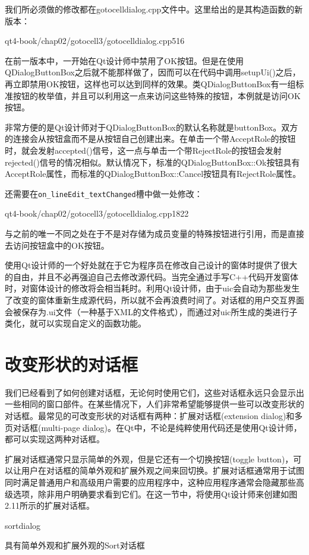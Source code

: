 \documentclass[11pt,oneside]{book}
\begin{document}
\begin{common-format}
我们所必须做的修改都在gotocelldialog.cpp文件中。这里给出的是其构造函数的新版本：
\begin{cppline}{qt4-book/chap02/gotocell3/gotocelldialog.cpp}{5}{16}
\end{cppline}

在前一版本中，一开始在Qt设计师中禁用了OK按钮。但是在使用QDialogButtonBox之后就不能那样做了，因而可以在代码中调用setupUi()之后，再立即禁用OK按钮，这样也可以达到同样的效果。类QDialogButtonBox有一组标准按钮的枚举值，并且可以利用这一点来访问这些特殊的按钮，本例就是访问OK按钮。

非常方便的是Qt设计师对于QDialogButtonBox的默认名称就是buttonBox。双方的连接会从按钮盒而不是从按钮自己创建出来。在单击一个带AcceptRole的按钮时，就会发射accepted()信号，这一点与单击一个带RejectRole的按钮会发射rejected()信号的情况相似。默认情况下，标准的QDialogButtonBox::Ok按钮具有AcceptRole属性，而标准的QDialogButtonBox::Cancel按钮具有RejectRole属性。

还需要在\verb+on_lineEdit_textChanged+槽中做一处修改：
\begin{cppline}{qt4-book/chap02/gotocell3/gotocelldialog.cpp}{18}{22}
\end{cppline}

与之前的唯一不同之处在于不是对存储为成员变量的特殊按钮进行引用，而是直接去访问按钮盒中的OK按钮。

使用Qt设计师的一个好处就在于它为程序员在修改自己设计的窗体时提供了很大的自由，并且不必再强迫自己去修改源代码。当完全通过手写C++代码开发窗体时，对窗体设计的修改将会相当耗时。利用Qt设计师，由于uic会自动为那些发生了改变的窗体重新生成源代码，所以就不会再浪费时间了。对话框的用户交互界面会被保存为.ui文件（一种基于XML的文件格式），而通过对uic所生成的类进行子类化，就可以实现自定义的函数功能。

\section{改变形状的对话框}
我们已经看到了如何创建对话框，无论何时使用它们，这些对话框永远只会显示出一些相同的窗口部件。在某些情况下，人们非常希望能够提供一些可以改变形状的对话框。最常见的可改变形状的对话框有两种：扩展对话框(extension dialog)和多页对话框(multi-page dialog)。在Qt中，不论是纯粹使用代码还是使用Qt设计师，都可以实现这两种对话框。

扩展对话框通常只显示简单的外观，但是它还有一个切换按钮(toggle button)，可以让用户在对话框的简单外观和扩展外观之间来回切换。扩展对话框通常用于试图同时满足普通用户和高级用户需要的应用程序中，这种应用程序通常会隐藏那些高级选项，除非用户明确要求看到它们。在这一节中，将使用Qt设计师来创建如图2.11所示的扩展对话框。
\begin{linefig}[0.8]{sortdialog}
\caption{具有简单外观和扩展外观的Sort对话框}
\label{fig:sortdialog}
\end{linefig}


\end{common-format}
\end{document}
